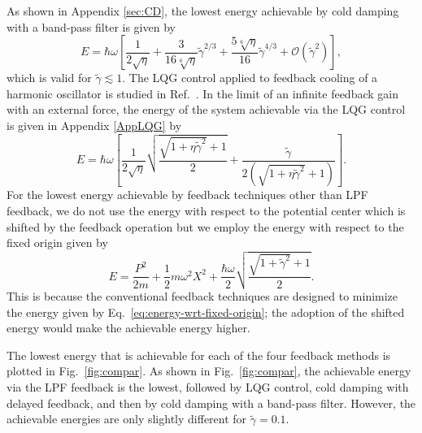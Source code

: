 \documentclass[aps,pra,superscriptaddress,twocolumn
]{revtex4-2}
\newcommand{\majrev}[1]{{#1}}
\begin{document}
 As shown in Appendix \ref{sec:CD}, 
 the lowest energy achievable by cold damping with a band-pass filter is given by 
 \begin{equation}
  E = \hbar\omega\left[\frac{1}{2\sqrt{\eta}} 
  + \frac{3 }{16\sqrt[6]{\eta}}\tilde \gamma^{2/3}
  + \frac{5 \sqrt[6]{\eta} }{16}\tilde{\gamma}^{4/3} + \mathcal{O}(\tilde{\gamma}^2)\right]
    \label{eq:CDapp},
  \end{equation}
 which is valid for $\tilde \gamma \lesssim 1$.
 The LQG control applied to feedback cooling of a harmonic oscillator 
 is studied in Ref.~\cite{PhysRevA.60.2700}. 
 In the limit of an infinite feedback gain with an external force, 
 the energy of the system achievable via the LQG control is given 
 in Appendix \ref{AppLQG} by 
 \begin{equation}
  E = \hbar \omega
  \left[\frac{1}{2\sqrt{\eta}} \sqrt{\frac{\sqrt{1+\eta \tilde \gamma^2} + 1}{2}}
  + \frac{\tilde \gamma}{2(\sqrt{1+\eta \tilde \gamma^2}+1)}
  \right]. \label{eq:LQG}
 \end{equation}
 \majrev{For the lowest energy achievable 
 by feedback techniques other than LPF feedback, 
 we do not use the energy with respect to the potential center 
 which is shifted by the feedback operation
 but we employ the energy with respect to the fixed origin given by 
 \begin{equation}
  E = \frac{P^2}{2m}+\frac{1}{2}m\omega^2 X^2 + 
  \frac{\hbar\omega}{2} \sqrt{\frac{\sqrt{1+\tilde \gamma^2}+1}{2}}.
  \label{eq:energy-wrt-fixed-origin}
 \end{equation}
 This is because the conventional feedback techniques
 are designed to minimize the energy 
 given by Eq.~\eqref{eq:energy-wrt-fixed-origin};
 the adoption of the shifted energy would 
 make the achievable energy higher. 
 }



 
 The lowest energy that is achievable for each of the {four} feedback methods is
 plotted in Fig.~\ref{fig:compar}. 
 As shown in Fig.~\ref{fig:compar}, 
 the achievable energy via the LPF feedback is the lowest, 
 followed by LQG control, {cold damping with delayed feedback,}
 and then by cold damping with a band-pass filter. 
 However, the achievable energies are only slightly different 
 for $\tilde \gamma =0.1$.
 

 
 
\end{document}
